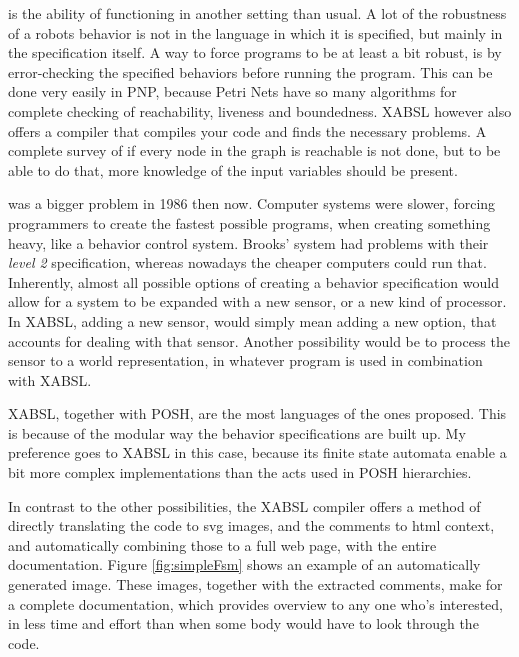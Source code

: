 \documentclass[a4paper,10pt]{article}
\begin{document}
 is the ability of functioning in another setting than usual. A
lot of the robustness of a robots behavior is not in the language in which it is
specified, but mainly in the specification itself. A way to force programs to be
at least a bit robust, is by error-checking the specified behaviors before
running the program. This can be done very easily in PNP, because Petri Nets
have so many algorithms for complete checking of reachability, liveness and
boundedness. XABSL however also offers a compiler that compiles your code and
finds the necessary problems. A complete survey of if every node in the graph is
reachable is not done, but to be able to do that, more knowledge of the input
variables should be present. 

 was a bigger problem in 1986 then now. Computer systems were
slower, forcing programmers to create the fastest possible programs, when
creating something heavy, like a behavior control system. Brooks' system had
problems with their \textit{level 2} specification, whereas nowadays the cheaper
computers could run that. Inherently, almost all possible options of creating a
behavior specification would allow for a system to be expanded with a new
sensor, or a new kind of processor. In XABSL, adding a new sensor, would simply
mean adding a new option, that accounts for dealing with that sensor. Another
possibility would be to process the sensor to a world representation, in
whatever program is used in combination with XABSL. 

XABSL, together with POSH, are the most  languages of the ones
proposed. This is because of the modular way the behavior specifications are
built up. My preference goes to XABSL in this case, because its finite state
automata enable a bit more complex implementations than the acts used in POSH
hierarchies. 

In contrast to the other possibilities, the XABSL compiler offers a method of
directly translating the code to svg images, and the comments to html context,
and automatically combining those to a full web page, with the entire
documentation. Figure \ref{fig:simpleFsm} shows an example of an automatically generated image.
These images, together with the extracted comments, make for a complete
documentation, which provides overview to any one who's interested, in less time
and effort than when some body would have to look through the code.
\end{document}
